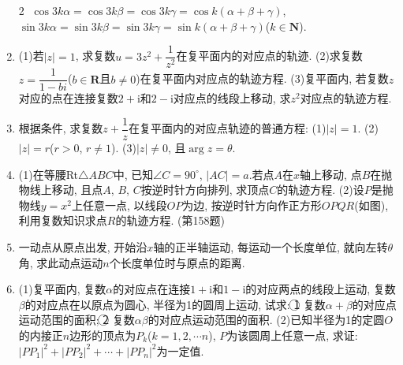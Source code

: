 \documentclass[10pt,a4paper]{article}
\begin{document}
\begin{enumerate}[1.]
\textcircled{2} $\cos 3k\alpha =\cos 3k\beta =\cos 3k\gamma =\cos k(\alpha +\beta +\gamma)$,
$\sin 3k\alpha =\sin 3k\beta =\sin 3k\gamma =\sin k(\alpha +\beta +\gamma)$($k\in \mathbf{N}$).
\item (1)若$|z|=1$, 求复数$u=3z^2+\dfrac 1{z^2}$在复平面内的对应点的轨迹.
(2)求复数$z=\dfrac 1{1-bi}$($b\in \mathbf{R}$且$b\ne 0$)在复平面内对应点的轨迹方程.
(3)复平面内, 若复数$z$对应的点在连接复数$2+\mathrm{i}$和$2-\mathrm{i}$对应点的线段上移动, 求$z^2$对应点的轨迹方程.
\item 根据条件, 求复数$z+\dfrac 1z$在复平面内的对应点轨迹的普通方程:
(1)$|z|=1$.
(2)$|z|=r$($r>0$, $r\ne 1$).
(3)$|z|\ne 0$, 且$\arg z=\theta$.
\item (1)在等腰Rt$\triangle ABC$中, 已知$\angle C=90^{\circ }$, $|AC|=a$.若点$A$在$x$轴上移动, 点$B$在抛物线上移动, 且点$A$, $B$, $C$按逆时针方向排列, 求顶点$C$的轨迹方程.
(2)设$P$是抛物线$y=x^2$上任意一点, 以线段$OP$为边, 按逆时针方向作正方形$OPQR$(如图), 利用复数知识求点$R$的轨迹方程.
(第158题)
\item 一动点从原点出发, 开始沿$x$轴的正半轴运动, 每运动一个长度单位, 就向左转$\theta$角, 求此动点运动$n$个长度单位时与原点的距离.
\item (1)复平面内, 复数$\alpha$的对应点在连接$1+\mathrm{i}$和$1-\mathrm{i}$的对应两点的线段上运动, 复数$\beta$的对应点在以原点为圆心, 半径为1的圆周上运动, 试求:
\textcircled{1} 复数$\alpha +\beta$的对应点运动范围的面积; 		\textcircled{2} 复数$\alpha \beta$的对应点运动范围的面积.
(2)已知半径为1的定圆$O$的内接正$n$边形的顶点为$P_k$($k=1,2,\cdots n$), $P$为该圆周上任意一点, 求证: $|PP_1|^2+|PP_2|^2+\cdots +|PP_n|^2$为一定值.


\end{enumerate}
\end{document}
